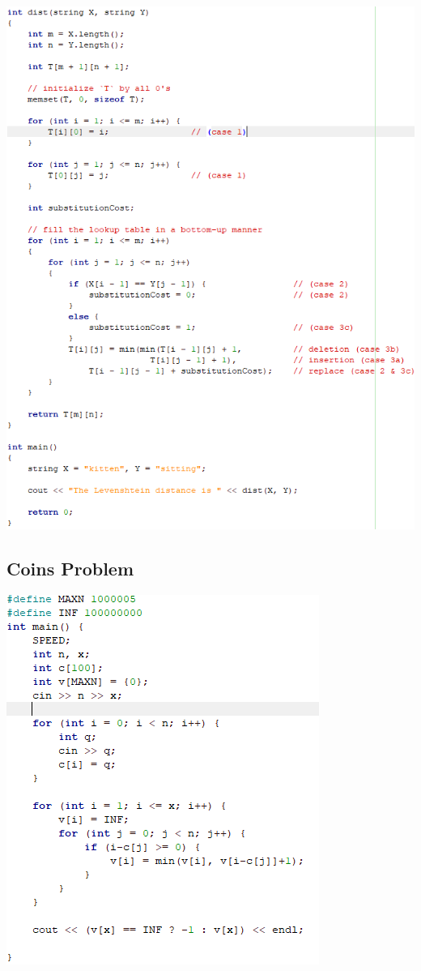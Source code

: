 \documentclass[11pt,twocolumn]{article}
\begin{document}
\includegraphics[scale=0.5]{edit}

\subsection{Coins Problem}
\includegraphics[scale=0.7]{coins}
\end{document}
